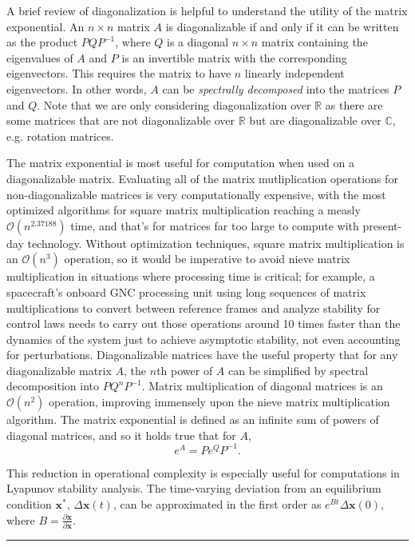 \documentclass[10pt]{article}
\begin{document}
A brief review of diagonalization is helpful to understand the utility of the matrix exponential. An $n\times n$ matrix $A$ is diagonalizable if and only if it can be written as the product $PQP^{-1}$, where $Q$ is a diagonal $n\times n$ matrix containing the eigenvalues of $A$ and $P$ is an invertible matrix with the corresponding eigenvectors. This requires the matrix to have $n$ linearly independent eigenvectors. In other words, $A$ can be \textit{spectrally decomposed} into the matrices $P$ and $Q$. Note that we are only considering diagonalization over $\mathbb{R}$ as there are some matrices that are not diagonalizable over $\mathbb{R}$ but are diagonalizable over $\mathbb{C}$, e.g. rotation matrices.

The matrix exponential is most useful for computation when used on a diagonalizable matrix. Evaluating all of the matrix mutliplication operations for non-diagonalizable matrices is very computationally expensive, with the most optimized algorithms for square matrix multiplication reaching a measly $\mathcal{O}(n^{2.37188})$ time, and that's for matrices far too large to compute with present-day technology. Without optimization techniques, square matrix multiplication is an $\mathcal{O}(n^3)$ operation, so it would be imperative to avoid nieve matrix multiplication in situations where processing time is critical; for example, a spacecraft's onboard GNC processing unit using long sequences of matrix multiplications to convert between reference frames and analyze stability for control laws needs to carry out those operations around 10 times faster than the dynamics of the system just to achieve asymptotic stability, not even accounting for perturbations. Diagonalizable matrices have the useful property that for any diagonalizable matrix $A$, the $n$th power of $A$ can be simplified by spectral decomposition into $PQ^nP^{-1}$. Matrix multiplication of diagonal matrices is an $\mathcal{O}(n^2)$ operation, improving immensely upon the nieve matrix multiplication algorithm. The matrix exponential is defined as an infinite sum of powers of diagonal matrices, and so it holds true that for $A$,
\begin{equation}
e^A = Pe^QP^{-1}.
\end{equation}

This reduction in operational complexity is especially useful for computations in Lyapunov stability analysis. The time-varying deviation from an equilibrium condition $\mathbf{x}^*$, $\Delta \mathbf{x}(t)$, can be approximated in the first order as $e^{B t}\Delta \mathbf{x}(0),$ where $B = \frac{\partial{\dot{\mathbf{x}}}}{\partial{\mathbf{x}}}$.

\begin{center}
\rule{\textwidth}{0.5pt}
\end{center}
\end{document}
